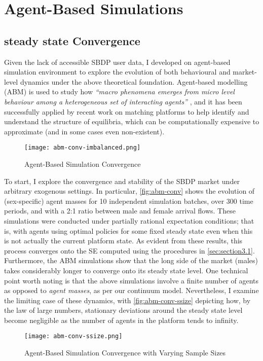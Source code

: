 \section{Agent-Based Simulations}
\label{sec:section4}  
\subsection{steady state Convergence}
Given the lack of accessible SBDP user data, I developed on agent-based simulation environment to explore the evolution of both behavioural and market-level dynamics under the above theoretical foundation. 
Agent-based modelling (ABM) is used to study how \textit{``macro phenomena emerges from micro level behaviour among a heterogeneous set of interacting agents''} \citep{janssen2005agent}, and it has been successfully applied by recent work on matching platforms \citep{immorlica2021designing} to help identify and understand the structure of equilibria, which can be computationally expensive to approximate (and in some cases even non-existent). 
\begin{figure}[ht]
    \centering
    \caption{Agent-Based Simulation Convergence}
    \texttt{[image: abm-conv-imbalanced.png]}
    \label{fig:abm-conv} 
\end{figure} 
To start, I explore the convergence and stability of the SBDP market under arbitrary exogenous settings. 
In particular, \autoref{fig:abm-conv} shows the evolution of (sex-specific) agent masses for 10 independent simulation batches, over 300 time periods, and with a 2:1 ratio between male and female arrival flows. 
These simulations were conducted under partially rational expectation conditions; that is, with agents using optimal policies for some fixed steady state even when this is not actually the current platform state.  
As evident from these results, this process converges onto the SE computed using the procedures in \autoref{sec:section3.1}. 
Furthermore, the ABM simulations show that the long side of the market (males) takes considerably longer to converge onto its steady state level. 
One technical point worth noting is that the above simulations involve a finite number of agents as opposed to \textit{agent masses}, as per our continuum model.  
Nevertheless, I examine the limiting case of these dynamics, with \autoref{fig:abm-conv-ssize} depicting how, by the law of large numbers, stationary deviations around the steady state level become negligible as the number of agents in the platform tends to infinity.  
\begin{figure}[ht] 
    \centering
    \caption{Agent-Based Simulation Convergence with Varying Sample Sizes}
    \texttt{[image: abm-conv-ssize.png]}
    \label{fig:abm-conv-ssize}
\end{figure}  
